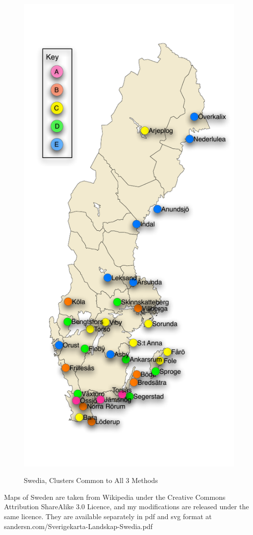 \begin{figure}
  \includegraphics{Sverigekarta-Landskap-Swedia} %
  \label{agree-clusters}
  \caption{Swedia, Clusters Common to All 3 Methods}
\end{figure}
Maps of Sweden are taken from Wikipedia under the Creative Commons
Attribution ShareAlike 3.0 Licence, and my modifications are released
under the same licence. They are available separately in pdf and svg
format at sandersn.com/Sverigekarta-Landskap-Swedia.pdf

